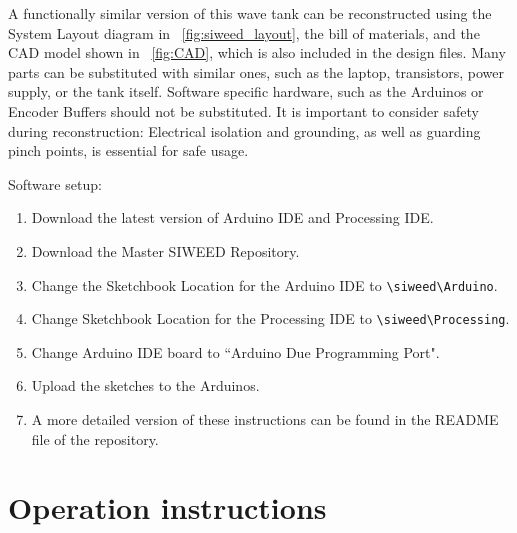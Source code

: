 \documentclass[11pt, letterpaper]{article}
\begin{document}
A functionally similar version of this wave tank can be reconstructed using the System Layout diagram in \figurename~\ref{fig:siweed_layout}, the bill of materials, and the CAD model shown in \figurename~\ref{fig:CAD}, which is also included in the design files.
Many parts can be substituted with similar ones, such as the laptop, transistors, power supply, or the tank itself.
Software specific hardware, such as the Arduinos or Encoder Buffers should not be substituted. 
It is important to consider safety during reconstruction: Electrical isolation and grounding, as well as guarding pinch points, is essential for safe usage.


Software setup:
\begin{enumerate}
\item Download the latest version of Arduino IDE and Processing IDE.
\item Download the Master SIWEED Repository.
\item Change the Sketchbook Location for the Arduino IDE to \texttt{\textbackslash siweed\textbackslash Arduino}.
\item Change Sketchbook Location for the Processing IDE to \texttt{\textbackslash siweed\textbackslash Processing}.
\item Change Arduino IDE board to ``Arduino Due Programming Port".
\item Upload the sketches to the Arduinos.
\item A more detailed version of these instructions can be found in the README file of the repository.
\end{enumerate}

\section{Operation instructions}
\end{document}
